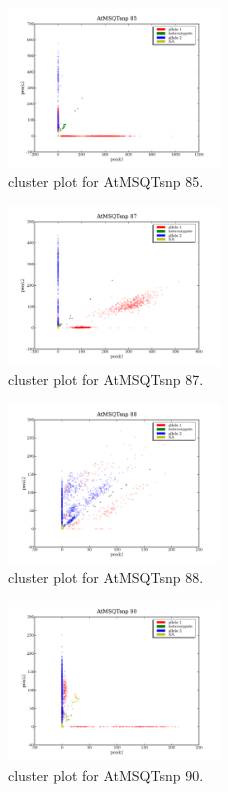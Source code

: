 \begin{figure}[H]
\includegraphics[width=0.5\textwidth]{figures/cluster_plot_AtMSQTsnp_85.png}
\caption{cluster plot for AtMSQTsnp 85.} \label{flAtMSQTsnp85}
\end{figure}
\begin{figure}[H]
\includegraphics[width=0.5\textwidth]{figures/cluster_plot_AtMSQTsnp_87.png}
\caption{cluster plot for AtMSQTsnp 87.} \label{flAtMSQTsnp87}
\end{figure}
\begin{figure}[H]
\includegraphics[width=0.5\textwidth]{figures/cluster_plot_AtMSQTsnp_88.png}
\caption{cluster plot for AtMSQTsnp 88.} \label{flAtMSQTsnp88}
\end{figure}
\begin{figure}[H]
\includegraphics[width=0.5\textwidth]{figures/cluster_plot_AtMSQTsnp_90.png}
\caption{cluster plot for AtMSQTsnp 90.} \label{flAtMSQTsnp90}
\end{figure}
